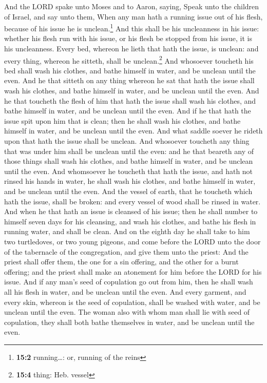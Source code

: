  And the LORD spake unto Moses and to Aaron, saying,
 Speak unto the children of Israel, and say unto them,
When any man hath a running issue out of his flesh, because of his issue
he is unclean.\footnote{\textbf{15:2} running\ldots: or, running of the
  reins}  And this shall be his uncleanness in his issue:
whether his flesh run with his issue, or his flesh be stopped from his
issue, it is his uncleanness.  Every bed, whereon he lieth
that hath the issue, is unclean: and every thing, whereon he sitteth,
shall be unclean.\footnote{\textbf{15:4} thing: Heb. vessel}
 And whosoever toucheth his bed shall wash his clothes,
and bathe himself in water, and be unclean until the even.
 And he that sitteth on any thing whereon he sat that hath
the issue shall wash his clothes, and bathe himself in water, and be
unclean until the even.  And he that toucheth the flesh of
him that hath the issue shall wash his clothes, and bathe himself in
water, and be unclean until the even.  And if he that hath
the issue spit upon him that is clean; then he shall wash his clothes,
and bathe himself in water, and be unclean until the even.
 And what saddle soever he rideth upon that hath the issue
shall be unclean.  And whosoever toucheth any thing that
was under him shall be unclean until the even: and he that beareth any
of those things shall wash his clothes, and bathe himself in water, and
be unclean until the even.  And whomsoever he toucheth
that hath the issue, and hath not rinsed his hands in water, he shall
wash his clothes, and bathe himself in water, and be unclean until the
even.  And the vessel of earth, that he toucheth which
hath the issue, shall be broken: and every vessel of wood shall be
rinsed in water.  And when he that hath an issue is
cleansed of his issue; then he shall number to himself seven days for
his cleansing, and wash his clothes, and bathe his flesh in running
water, and shall be clean.  And on the eighth day he
shall take to him two turtledoves, or two young pigeons, and come before
the LORD unto the door of the tabernacle of the congregation, and give
them unto the priest:  And the priest shall offer them,
the one for a sin offering, and the other for a burnt offering; and the
priest shall make an atonement for him before the LORD for his issue.
 And if any man's seed of copulation go out from him,
then he shall wash all his flesh in water, and be unclean until the
even.  And every garment, and every skin, whereon is the
seed of copulation, shall be washed with water, and be unclean until the
even.  The woman also with whom man shall lie with seed
of copulation, they shall both bathe themselves in water, and be unclean
until the even.


